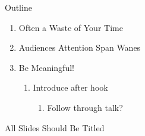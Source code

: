 \documentclass[aspectratio=169]{beamer}
\begin{document}
  \titleframe
  \begin{frame}
    \begin{centering}
      \vspace{-1cm}
      \Huge Outline \\
      \vspace{3mm}
    \end{centering}
    \begin{enumerate}
      \item Often a Waste of Your Time
      \item Audiences Attention Span Wanes
      \item Be Meaningful! \\[1mm]
      \begin{enumerate}
        \item Introduce after hook \\[2mm]
        \begin{enumerate}
          \item Follow through talk?
        \end{enumerate}
      \end{enumerate}
    \end{enumerate}
  \end{frame}
  \begin{frame}
    \begin{centering}
      \vspace{-1cm}
      \Huge All Slides Should Be Titled \\
      \vspace{3mm}
    \end{centering}
  \end{frame}
\end{document}
